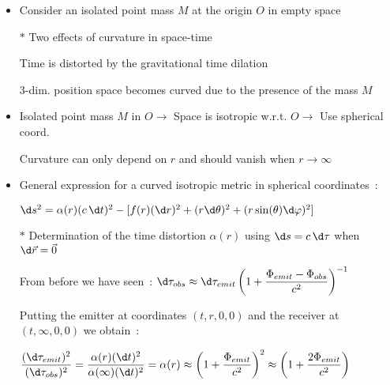 \onecolumn
\begin{itemize}
\item Consider an isolated point mass $M$ at the origin $O$ in empty space
\item[$\ast$] Two effects of curvature in space-time
\item[] Time is distorted by the gravitational time dilation
\item[] 3-dim. position space becomes curved due to the presence of the mass $M$
\item Isolated point mass $M$ in $O \rightarrow$ Space is isotropic w.r.t. $O \rightarrow$ Use spherical coord.
\item[] Curvature can only depend on $r$ and should vanish when $r \rightarrow \infty$
\item General expression for a curved isotropic metric in spherical coordinates~:
\item[] {\blue $\d s^{2}=\alpha(r)(c\,\d t)^{2}-[f(r)(\d r)^{2}+(r\d\theta)^{2}+(r\sin(\theta)\d\varphi)^{2}]$}
\item[$\ast$] {\red Determination of the time distortion $\alpha(r)$
               using $\d s=c\,\d\tau$ when $\d\vec{r}=\vec{0}$}
\item[] From before we have seen~: 
        $\displaystyle \d\tau_{obs} \approx
         \d\tau_{emit}\left(1+\frac{\Phi_{emit}-\Phi_{obs}}{c^{2}}\right)^{-1}$
\item[] Putting the emitter at coordinates $(t,r,0,0)$ and the receiver at $(t,\infty,0,0)$ we obtain~:
\item[] $\displaystyle
         \frac{(\d\tau_{emit})^{2}}{(\d\tau_{obs})^{2}}
         =\frac{\alpha(r)(\d t)^{2}}{\alpha(\infty)(\d t)^{2}}=\alpha(r)
         \approx \left(1+\frac{\Phi_{emit}}{c^{2}}\right)^{2}
         \approx \left(1+\frac{2\Phi_{emit}}{c^{2}}\right)$
\end{itemize}

